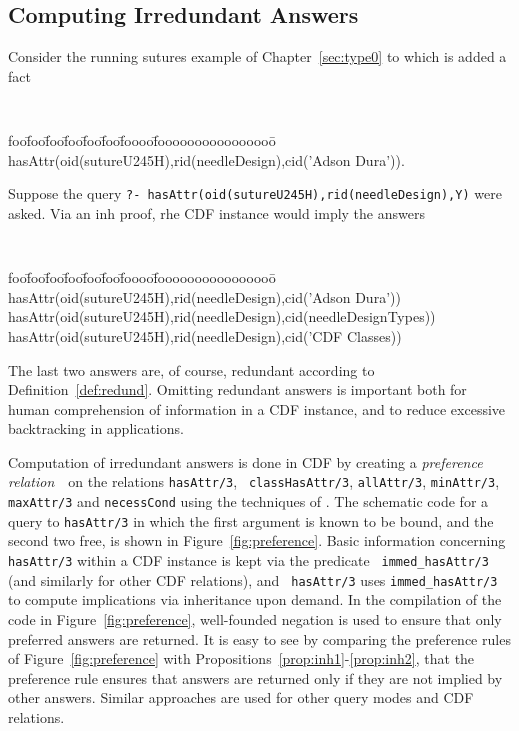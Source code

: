 \subsection{Computing Irredundant Answers}

Consider the running sutures example of Chapter~\ref{sec:type0} to
which is added a fact
%
{\small 
{\tt 
\begin{tabbing}
foo\=foo\=foo\=foo\=foo\=foo\=foooo\=foooooooooooooooo\=\kill
\> hasAttr(oid(sutureU245H),rid(needleDesign),cid('Adson Dura')).
\end{tabbing} } } 
%
\noindent
Suppose the query {\tt ?-
hasAttr(oid(sutureU245H),rid(needleDesign),Y)} were asked.  Via an
{\sc inh} proof, rhe CDF instance would imply the answers 
%
{\small {\tt
\begin{tabbing}
foo\=foo\=foo\=foo\=foo\=foo\=foooo\=foooooooooooooooo\=\kill
\>  hasAttr(oid(sutureU245H),rid(needleDesign),cid('Adson Dura')) \\
\> hasAttr(oid(sutureU245H),rid(needleDesign),cid(needleDesignTypes)) \\
\>  hasAttr(oid(sutureU245H),rid(needleDesign),cid('CDF Classes))
\end{tabbing} } }
%
\noindent
The last two answers are, of course, redundant according to
Definition~\ref{def:redund}.  Omitting redundant answers is important
both for human comprehension of information in a CDF instance, and to
reduce excessive backtracking in applications.

Computation of irredundant answers is done in CDF by creating a {\em
preference relation}\ \ on the relations {\tt hasAttr/3}, {\tt
classHasAttr/3}, {\tt allAttr/3}, {\tt minAttr/3}, {\tt maxAttr/3} and
{\tt necessCond} using the techniques of \cite{CuSw02}.  The schematic
code for a query to {\tt hasAttr/3} in which the first argument is
known to be bound, and the second two free, is shown in
Figure~\ref{fig:preference}.  Basic information concerning {\tt
hasAttr/3} within a CDF instance is kept via the predicate {\tt
immed\_hasAttr/3} (and similarly for other CDF relations), and {\tt
hasAttr/3} uses {\tt immed\_hasAttr/3} to compute implications via
inheritance upon demand.  In the compilation of the code in
Figure~\ref{fig:preference}, well-founded negation is used to ensure
that only preferred answers are returned.  It is easy to see by
comparing the preference rules of Figure~\ref{fig:preference} with
Propositions~\ref{prop:inh1}-\ref{prop:inh2}, that the preference rule
ensures that answers are returned only if they are not implied by
other answers.  Similar approaches are used for other query modes and
CDF relations.  

